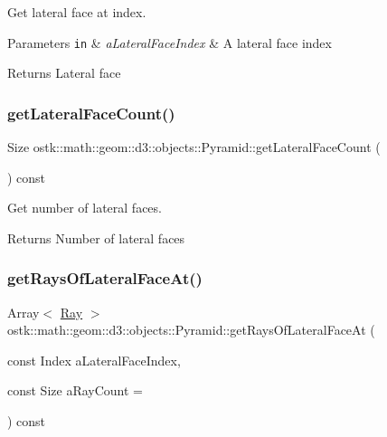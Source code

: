 Get lateral face at index. 


\begin{DoxyParams}[1]{Parameters}
\mbox{\tt in}  & {\em a\+Lateral\+Face\+Index} & A lateral face index \\
\hline
\end{DoxyParams}
\begin{DoxyReturn}{Returns}
Lateral face 
\end{DoxyReturn}
\mbox{\label{classostk_1_1math_1_1geom_1_1d3_1_1objects_1_1_pyramid_af853f40f9b9501c7fcad30337d646c4c}} 
\subsubsection{\texorpdfstring{get\+Lateral\+Face\+Count()}{getLateralFaceCount()}}
{\footnotesize\ttfamily Size ostk\+::math\+::geom\+::d3\+::objects\+::\+Pyramid\+::get\+Lateral\+Face\+Count (\begin{DoxyParamCaption}{ }\end{DoxyParamCaption}) const}



Get number of lateral faces. 

\begin{DoxyReturn}{Returns}
Number of lateral faces 
\end{DoxyReturn}
\mbox{\label{classostk_1_1math_1_1geom_1_1d3_1_1objects_1_1_pyramid_a798481e060dc0af1ed8ed57a75d8fa9b}} 
\subsubsection{\texorpdfstring{get\+Rays\+Of\+Lateral\+Face\+At()}{getRaysOfLateralFaceAt()}}
{\footnotesize\ttfamily Array$<$ \hyperlink{classostk_1_1math_1_1geom_1_1d3_1_1objects_1_1_ray}{Ray} $>$ ostk\+::math\+::geom\+::d3\+::objects\+::\+Pyramid\+::get\+Rays\+Of\+Lateral\+Face\+At (\begin{DoxyParamCaption}\item[{const Index}]{a\+Lateral\+Face\+Index,  }\item[{const Size}]{a\+Ray\+Count = {} }\end{DoxyParamCaption}) const}



